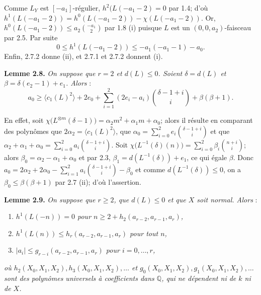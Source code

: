 
Comme \(L_Y\) est \([-a_1]\)-régulier, \(h^2(L(-a_1-2)=0\) par 1.4; d'où \(h^1(L(-a_1-2))=h^0(L(-a_1-2))-\chi(L(-a_1-2))\). Or, \(h^0(L(-a_1-2))\le a_2\binom{-a_1}{2}\) par 1.8 (i) puisque \(L\) est un \((0,0,a_2)\)-faisceau par 2.5. Par suite
\[
0\le h^1(L(-a_1-2))\le -a_1(-a_1-1)-a_0.
\tag{2.7.2}
\]
Enfin, 2.7.2 donne (ii), et 2.7.1 et 2.7.2 donnent (i).

\textbf{Lemme 2.8.} \emph{On suppose que \(r=2\) et \(d(L)\le0\). Soient \(\delta=d(L)\) et \(\beta=\delta(e_2-1)+e_1\). Alors} :
\[
a_0\ge
\langle c_1(L)^2\rangle+2e_0+
\sum_{i=1}^{2}(2e_i-a_i)\binom{\delta-1+i}{i}
+\beta(\beta+1).
\]

En effet, soit \(\chi\bigl(L^{\otimes m}(\delta-1)\bigr)=\alpha_2m^2+\alpha_1m+\alpha_0\); alors il résulte en comparant des polynômes que \(2\alpha_2=\langle c_1(L)^2\rangle\), que \(\alpha_0=\sum_{i=0}^{2}e_i\binom{\delta-1+i}{i}\) et que \(\alpha_2+\alpha_1+\alpha_0=\sum_{i=0}^{2}a_i\binom{\delta-1+i}{i}\). Soit \(\chi\bigl(L^{-1}(\delta)(n)\bigr)=\sum_{i=0}^{2}\beta_i\binom{n+i}{i}\); alors \(\beta_0=\alpha_2-\alpha_1+\alpha_0\) et par 2.3, \(\beta_1=d(L^{-1}(\delta))+e_1\), ce qui égale \(\beta\). Donc \(a_0=2\alpha_2+2\alpha_0-\sum_{i=1}^{2}a_i\binom{\delta-1+i}{i}-\beta_0\) et comme \(d(L^{-1}(\delta))\le0\), on a \(\beta_0\le\beta(\beta+1)\) par 2.7 (ii); d'où l'assertion.

\textbf{Lemme 2.9.} \emph{On suppose que \(r\ge2\), que \(d(L)\le0\) et que \(X\) soit normal. Alors} :
\begin{enumerate}[label=(\roman*)]
\item \emph{\(h^1(L(-n))=0\) pour \(n\ge2+h_2(a_{r-2},a_{r-1},a_r)\),}
\item \emph{\(h^1(L(n))\le h_r(a_{r-2},a_{r-1},a_r)\) pour tout \(n\),}
\item \emph{\(|a_i|\le g_{r-i}(a_{r-2},a_{r-1},a_r)\) pour \(i=0,\ldots,r\),}
\end{enumerate}
\emph{où \(h_2(X_0,X_1,X_2),h_3(X_0,X_1,X_2),\ldots\) et \(g_0(X_0,X_1,X_2),g_1(X_0,X_1,X_2),\ldots\) sont des polynômes universels à coefficients dans \(\mathbb Q\), qui ne dépendent ni de \(k\) ni de \(X\).}

